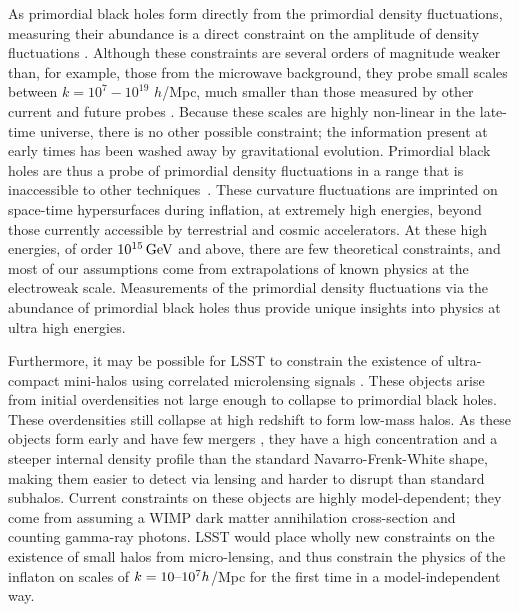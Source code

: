 As primordial black holes form directly from the primordial density fluctuations, measuring their abundance is a direct constraint on the amplitude of density fluctuations \citep{Clesse:2015}. Although these constraints are several orders of magnitude weaker than, for example, those from the microwave background, they probe small scales between $k = 10^{7} - 10^{19}$ $h$/Mpc, much smaller than those measured by other current and future probes \citep{Bringmann:2012}. Because these scales are highly non-linear in the late-time universe, there is no other possible constraint; the information present at early times has been washed away by gravitational evolution. Primordial black holes are thus a probe of primordial density fluctuations in a range that is inaccessible to other techniques~\citep{Bellido:2017,Bellido:2018}. These curvature fluctuations are imprinted on space-time hypersurfaces during inflation, at extremely high energies, beyond those currently accessible by terrestrial and cosmic accelerators. 
At these high energies, of order $10^{15} \mathrm{\,GeV}$ and above, there are few theoretical constraints, and most of our assumptions come from extrapolations of known physics at the electroweak scale. Measurements of the primordial density fluctuations via the abundance of primordial black holes thus provide unique insights into physics at ultra high energies.


Furthermore, it may be possible for LSST to constrain the existence of ultra-compact mini-halos using correlated microlensing signals \citep{erickcek2011,li2012}. These objects arise from initial overdensities not large enough to collapse to primordial black holes. These overdensities still collapse at high redshift to form low-mass halos. As these objects form early and have few mergers \citep{Bringmann:2012,Delos:2018}, they have a high concentration and a steeper internal density profile than the standard Navarro-Frenk-White shape, making them easier to detect via lensing and harder to disrupt than standard subhalos. Current constraints on these objects are highly model-dependent; they come from assuming a WIMP dark matter annihilation cross-section and counting gamma-ray photons. LSST would place wholly new constraints on the existence of small halos from micro-lensing, and thus constrain the physics of the inflaton on scales of $k = 10 \textup{--} 10^7 h$/Mpc for the first time in a model-independent way.



